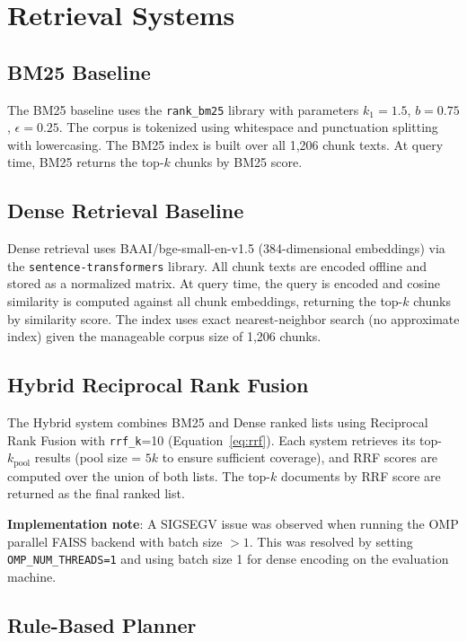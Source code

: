 \section{Retrieval Systems}
\label{sec:method_retrieval}

\subsection{BM25 Baseline}

The BM25 baseline uses the \texttt{rank\_bm25} library with parameters $k_1{=}1.5$, $b{=}0.75$, $\epsilon{=}0.25$. The corpus is tokenized using whitespace and punctuation splitting with lowercasing. The BM25 index is built over all 1,206 chunk texts. At query time, BM25 returns the top-$k$ chunks by BM25 score.

\subsection{Dense Retrieval Baseline}

Dense retrieval uses BAAI/bge-small-en-v1.5 (384-dimensional embeddings) via the \texttt{sentence-transformers} library. All chunk texts are encoded offline and stored as a normalized matrix. At query time, the query is encoded and cosine similarity is computed against all chunk embeddings, returning the top-$k$ chunks by similarity score. The index uses exact nearest-neighbor search (no approximate index) given the manageable corpus size of 1,206 chunks.

\subsection{Hybrid Reciprocal Rank Fusion}

The Hybrid system combines BM25 and Dense ranked lists using Reciprocal Rank Fusion with \texttt{rrf\_k}{=}10 (Equation~\ref{eq:rrf}). Each system retrieves its top-$k_{\text{pool}}$ results (pool size = $5k$ to ensure sufficient coverage), and RRF scores are computed over the union of both lists. The top-$k$ documents by RRF score are returned as the final ranked list.

\noindent\textbf{Implementation note}: A SIGSEGV issue was observed when running the OMP parallel FAISS backend with batch size $> 1$. This was resolved by setting \texttt{OMP\_NUM\_THREADS=1} and using batch size 1 for dense encoding on the evaluation machine.

\subsection{Rule-Based Planner}

